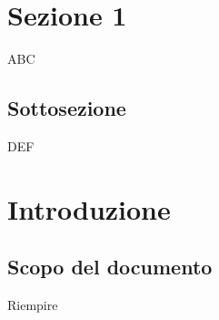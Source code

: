 \newcommand{\documento}{\SdF}
\newcommand{\nomedocumentofisico}{StudioDiFattibilit\`a\_v1\_0\_0.pdf}
\newcommand{\redazione}{\LC\\ & \TG\\ & \CV\\ & \SG\\ & \NC\\ & \MM}
\newcommand{\verifica}{\LC\\ & \TG}
\newcommand{\approvazione}{\CV}
\newcommand{\uso}{Interno}
\newcommand{\destinateTo}{\TV, \\ & \RC, \\ & \II}

\newcommand{\datacreazione}{22 novembre 2018}
\newcommand{\datamodifica}{07 Gennaio 2016}
\newcommand{\stato}{Approvato}

\def\TABELLE{false}	%
\def\FIGURE{false} 	%


%


\setcounter{secnumdepth}{4}
\setcounter{tocdepth}{4}


	
	
	
	\section{Sezione 1}
	ABC
	\subsection{Sottosezione}
	DEF
	
	
	\section{Introduzione} \label{introduzione}
		\subsection{Scopo del documento}
		Riempire
		
